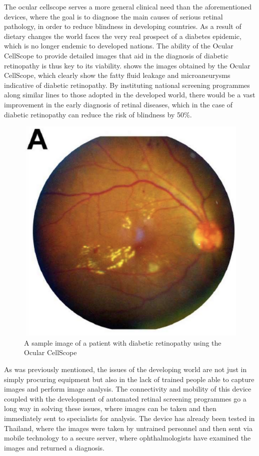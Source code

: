 The ocular cellscope serves a more general clinical need than the aforementioned
devices, where the goal is to diagnose the main causes of serious retinal pathology,
in order to reduce blindness in developing countries. As a result of dietary changes
the world faces the very real prospect of a diabetes epidemic, which is no longer
endemic to developed nations. \cite{burgess2013diabetic} The ability of the Ocular
CellScope to provide detailed images that aid in the diagnosis of diabetic retinopathy
is thus key to its viability.  shows the images obtained by the Ocular
CellScope, which clearly show the fatty fluid leakage and microaneurysms indicative of
diabetic retinopathy. By instituting national screening programmes along similar lines
to those adopted in the developed world, there would be a vast improvement in the early
diagnosis of retinal diseases, which in the case of diabetic retinopathy can reduce the
risk of blindness by 50\%. \cite{abramoff2010automated} 

\begin{figure}[htbp]
\centering
 \includegraphics{figures/ocularDR}
\caption{A sample image of a patient with diabetic retinopathy using the Ocular CellScope}
\label{fig:odr}
\end{figure}

As was previously mentioned, the issues of the developing world are not just in simply
procuring equipment but also in the lack of trained people able to capture images and
perform image analysis. The connectivity and mobility of this device coupled with the
development of automated retinal screening programmes go a long way in solving these issues,
where images can be taken and then immediately sent to specialists for analysis. The
device has already been tested in Thailand, where the images were taken by untrained
personnel and then sent via mobile technology to a secure server, where ophthalmologists
have examined the images and returned a diagnosis.  

